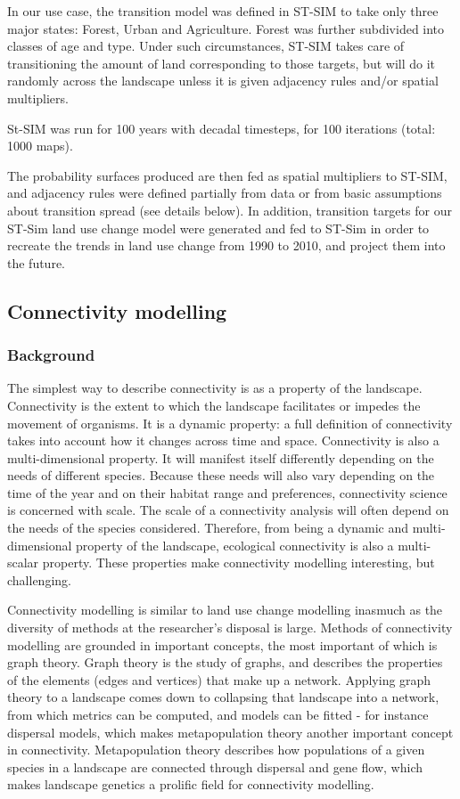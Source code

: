 In our use case, the transition model was defined in ST-SIM to take only three major states: Forest, Urban and Agriculture. Forest was further subdivided into classes of age and type. 
Under such circumstances, ST-SIM takes care of transitioning the amount of land corresponding to those targets, but will do it randomly across the landscape unless it is given adjacency rules and/or spatial multipliers. 

St-SIM was run for 100 years with decadal timesteps, for 100 iterations (total: 1000 maps).

The probability surfaces produced are then fed as spatial multipliers to ST-SIM, and adjacency rules were  defined partially from data or from basic assumptions about transition spread (see details below). In addition, transition targets for our ST-Sim land use change model were generated and fed to ST-Sim in order to recreate the trends in land use change from 1990 to 2010, and project them into the future. \\


\subsection{Connectivity modelling}

\subsubsection{Background}
The simplest way to describe connectivity is as a property of the landscape. Connectivity is the extent to which the landscape facilitates or impedes the movement of organisms. It is a dynamic property: a full definition of connectivity takes into account how it changes across time and space. Connectivity is also a multi-dimensional property. It will manifest itself differently depending on the needs of different species. Because these needs will also vary depending on the time of the year and on their habitat range and preferences, connectivity science is concerned with scale. The scale of a connectivity analysis will often depend on the needs of the species considered. Therefore, from being a dynamic and multi-dimensional property of the landscape, ecological connectivity is also a multi-scalar property. These properties make connectivity modelling interesting, but challenging.

Connectivity modelling is similar to land use change modelling inasmuch as the diversity of methods at the researcher’s disposal is large.  Methods of connectivity modelling are grounded in important concepts, the most important of which is graph theory. Graph theory is the study of graphs, and describes the properties of the elements (edges and vertices) that make up a network. Applying graph theory to a landscape comes down to collapsing that landscape into a network, from which metrics can be computed, and models can be fitted - for instance dispersal models, which makes metapopulation theory another important concept in connectivity. Metapopulation theory describes how populations of a given species in a landscape are connected through dispersal and gene flow, which makes landscape genetics a prolific field for connectivity modelling.

